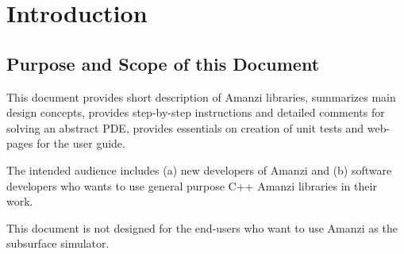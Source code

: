 
\section{Introduction}

\subsection{Purpose and Scope of this Document}
This document provides short description of Amanzi libraries, summarizes 
main design concepts, provides step-by-step instructions and detailed comments for solving 
an abstract PDE, provides essentials on creation of unit tests and web-pages for the user guide.

The intended audience includes (a) new developers of Amanzi and (b) software developers
who wants to use general purpose C++ Amanzi libraries in their work. 

This document is not designed for the end-users who want to use Amanzi as the 
subsurface simulator.









